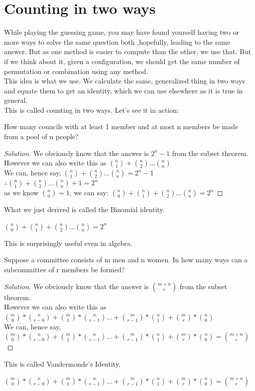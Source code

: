 \section{Counting in two ways}
While playing the guessing game, you may have found yourself having two or more ways to solve the same question both ,hopefully, leading to the same answer. But as one method is easier to compute than the other, we use that. But if we think about it, given a configuration, we should get the same number of permutation or combination using any method.\\
This idea is what we use. We calculate the same, generalized thing in two ways and equate them to get an identity, which we can use elsewhere as it is true in general.\\
This is called counting in two ways. Let's see it in action:
\begin{example}
    How many councils with at least 1 member and at most n members be made from a pool of n people?
\end{example}
\begin{proof}
    [Solution]
    We obviously know that the answer is $2^n - 1$ from the subset theorem. \\
    However we can also write this as $\binom{n}{1} + \binom{n}{2} \dots \binom{n}{n}$\\
    We can, hence say, $\binom{n}{1} + \binom{n}{2} \dots \binom{n}{n}= 2^n -1$ \\
    $\therefore \binom{n}{1} + \binom{n}{2} \dots \binom{n}{n} +1 = 2^n$ \\
    as we know $\binom{n}{0}=1$, we can say: $\binom{n}{0} + \binom{n}{1} + \binom{n}{2} \dots \binom{n}{n} = 2^n$
\end{proof}
What we just derived is called the Binomial identity.
\begin{theorem}
    $\binom{n}{0} + \binom{n}{1} + \binom{n}{2} \dots \binom{n}{n} = 2^n$
\end{theorem}
This is surprisingly useful even in algebra.\\
\begin{example}
     Suppose a committee consists of m men and n women. In how many ways can a subcommittee of r members be formed?
\end{example}
\begin{proof}
    [Solution]
    We obviously know that the answer is $\binom{m+n}{r}$ from the subset theorem. \\
    However we can also write this as $\binom{m}{0}*\binom{n}{r-0} + \binom{m}{1}*\binom{n}{r-1} \dots +\binom{m}{r-1}*\binom{n}{1}+\binom{m}{r}*\binom{n}{0}$\\
    We can, hence say, $\binom{m}{0}*\binom{n}{r-0} + \binom{m}{1}*\binom{n}{r-1} \dots +\binom{m}{r-1}*\binom{n}{1}+\binom{m}{r}*\binom{n}{0}=\binom{m+n}{r}$ \\
    \end{proof}
This is called Vandermonde’s Identity.
\begin{theorem}
    $\binom{m}{0}*\binom{n}{r-0} + \binom{m}{1}*\binom{n}{r-1} \dots +\binom{m}{r-1}*\binom{n}{1}+\binom{m}{r}*\binom{n}{0}=\binom{m+n}{r}$
\end{theorem}
